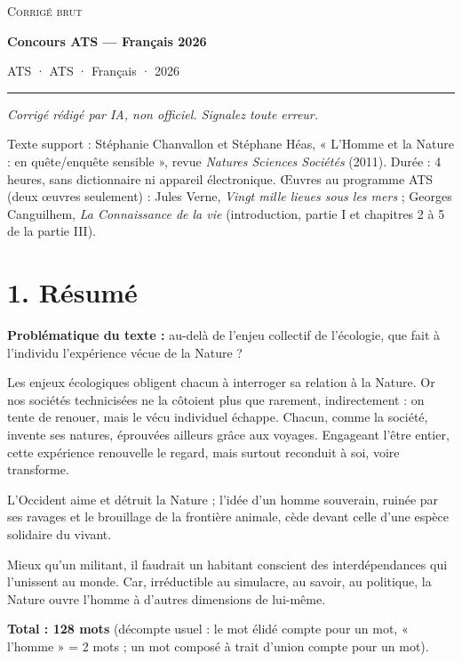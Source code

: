 \documentclass[11pt,a4paper]{article}
\begin{document}
\thispagestyle{plain}
\begin{center}
  {\small\scshape Corrigé brut}\par\smallskip
  {\LARGE\bfseries Concours ATS — Français 2026\par}\medskip
  {\large ATS · ATS · Français · 2026\par}
\end{center}
\vspace{2pt}\hrule\vspace{8pt}

\emph{Corrigé rédigé par IA, non officiel. Signalez toute erreur.}

Texte support : Stéphanie Chanvallon et Stéphane Héas, « L'Homme et la Nature : en quête/enquête sensible », revue \emph{Natures Sciences Sociétés} (2011). Durée : 4 heures, sans dictionnaire ni appareil électronique. Œuvres au programme ATS (deux œuvres seulement) : Jules Verne, \emph{Vingt mille lieues sous les mers} ; Georges Canguilhem, \emph{La Connaissance de la vie} (introduction, partie I et chapitres 2 à 5 de la partie III).

\hypertarget{ruxe9sumuxe9}{%
\section{1. Résumé}\label{ruxe9sumuxe9}}

\textbf{Problématique du texte :} au-delà de l'enjeu collectif de l'écologie, que fait à l'individu l'expérience vécue de la Nature ?

Les enjeux écologiques obligent chacun à interroger sa relation à la Nature. Or nos sociétés technicisées ne la côtoient plus \textbar{} que rarement, indirectement : on tente de renouer, mais le vécu individuel échappe. Chacun, comme la société, invente ses natures, éprouvées \textbar{} ailleurs grâce aux voyages. Engageant l'être entier, cette expérience renouvelle le regard, mais surtout reconduit à soi, voire transforme. \textbar{}

L'Occident aime et détruit la Nature ; l'idée d'un homme souverain, ruinée par ses ravages et le brouillage \textbar{} de la frontière animale, cède devant celle d'une espèce solidaire du vivant.

Mieux qu'un militant, il faudrait un \textbar{} habitant conscient des interdépendances qui l'unissent au monde. Car, irréductible au simulacre, au savoir, au politique, la Nature ouvre \textbar{} l'homme à d'autres dimensions de lui-même.

\textbf{Total : 128 mots} (décompte usuel : le mot élidé compte pour un mot, « l'homme » = 2 mots ; un mot composé à trait d'union compte pour un mot).
\end{document}
